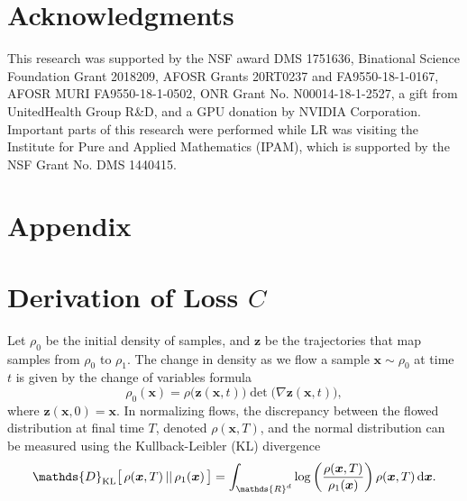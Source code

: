 \documentclass[letterpaper]{article}
\newcommand{\bfx}{\boldsymbol{x}}
\newcommand{\bfz}{\boldsymbol{z}}
\def\du{\ensuremath{\mathrm{d}}}
\newcommand{\R}{\ensuremath{\mathds{R}}}
\newcommand{\D}{\ensuremath{\mathds{D}}}
\begin{document}
\section*{Acknowledgments}
 	This research was supported by the NSF award DMS 1751636, Binational Science Foundation Grant 2018209, AFOSR Grants 20RT0237 and FA9550-18-1-0167, AFOSR MURI FA9550-18-1-0502, ONR Grant No. N00014-18-1-2527, a gift from UnitedHealth Group R\&D, and a GPU donation by NVIDIA Corporation. 
 	Important parts of this research were performed while LR was visiting the Institute for Pure and Applied Mathematics (IPAM), which is supported by the NSF Grant No. DMS 1440415.




\clearpage



\onecolumn

\section*{\LARGE{Appendix}}
\appendix



 \setcounter{figure}{0} 
 \setcounter{table}{0} 
 \renewcommand{\thefigure}{A\arabic{figure}}
 \renewcommand{\thetable}{A\arabic{table}}

\section{Derivation of Loss $C$} 
\label{app:G}

	Let $\rho_0$ be the initial density of samples, and $\bfz$ be the trajectories that map samples from $\rho_0$ to $\rho_1$. The change in density as we flow a sample $\bfx \sim \rho_0$ at time $t$ is given by the change of variables formula
	\begin{equation}
	  \label{eq:jacobi}
	  \rho_0(\bfx) = \rho \big( \bfz(\bfx, t) \big) \det \big( \nabla \bfz(\bfx, t) \big),
	\end{equation}
	where $\bfz(\bfx,0) = \bfx$. In normalizing flows, the discrepancy between the flowed distribution at final time $T$, denoted $\rho(\bfx,T)$, and the normal distribution can be measured using the Kullback-Leibler (KL) divergence%
	\begin{equation}
	  \label{eq:appKL}
	    \D_{\rm KL} \big[ \, \rho(\bfx,T) \, || \, \rho_1(\bfx) \, \big] 
	    = \int_{\R^d} \log\left(\frac{\rho(\bfx,T)}{\rho_1(\bfx)}\right) \rho(\bfx,T) \, \du\bfx.
	\end{equation}
	
\end{document}
